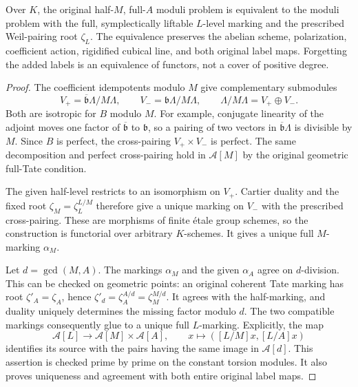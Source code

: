 \begin{theorem}
\label{thm:original-half-level-completion}
Over $K$, the original half-$M$, full-$A$ moduli problem is equivalent
to the moduli problem with the full, symplectically liftable $L$-level
marking and the prescribed Weil-pairing root $\zeta_L$.
The equivalence preserves the abelian scheme, polarization, coefficient
action, rigidified cubical line, and both original label maps.
Forgetting the added labels is an equivalence of functors, not a
cover of positive degree.
\end{theorem}
\begin{proof}
The coefficient idempotents modulo $M$ give complementary submodules
\[
 V_+=\overline{\mathfrak b}\Lambda/M\Lambda,
 \qquad V_-=\mathfrak b\Lambda/M\Lambda,
 \qquad \Lambda/M\Lambda=V_+\oplus V_-.
\]
Both are isotropic for $B$ modulo $M$.  For example, conjugate
linearity of the adjoint moves one factor of
$\overline{\mathfrak b}$ to $\mathfrak b$, so a pairing of two vectors
in $\overline{\mathfrak b}\Lambda$ is divisible by $M$.
Since $B$ is perfect, the cross-pairing $V_+\times V_-$ is perfect.
The same decomposition and perfect cross-pairing hold in
$\mathcal A[M]$ by the original geometric full-Tate condition.

The given half-level restricts to an isomorphism on $V_+$.
Cartier duality and the fixed root $\zeta_M=\zeta_L^{L/M}$ therefore
give a unique marking on $V_-$ with the prescribed cross-pairing.
These are morphisms of finite \'etale group schemes, so the construction
is functorial over arbitrary $K$-schemes.  It gives a unique full
$M$-marking $\alpha_M$.

Let $d=\gcd(M,A)$.  The markings $\alpha_M$ and the given
$\alpha_A$ agree on $d$-division.  This can be checked on geometric
points: an original coherent Tate marking has root
$\zeta'_A=\zeta_A$, hence
$\zeta'_d=\zeta_A^{A/d}=\zeta_M^{M/d}$.  It agrees with the
half-marking, and duality uniquely determines the missing factor
modulo $d$.  The two compatible markings consequently glue to a
unique full $L$-marking.  Explicitly, the map
\[
 \mathcal A[L]\longrightarrow
 \mathcal A[M]\times\mathcal A[A],\qquad
 x\longmapsto([L/M]x,[L/A]x)
\]
identifies its source with the pairs having the same image in
$\mathcal A[d]$.  This assertion is checked prime by prime on the
constant torsion modules.  It also proves uniqueness and agreement
with both entire original label maps.


\end{proof}
